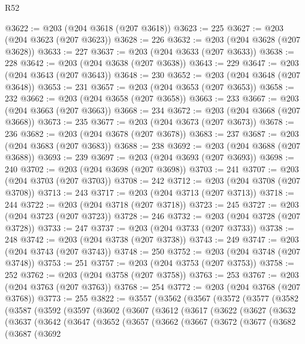 \begin{lexlean}{R52}
\begin{coremodule}
{{{{{{{{{{{{{{{{{{{{{{{{{{{{{{{{{{{{{{{{{{{{{{{{{{{{{{{{{{{{{{{{{{{{{{{{{{{{{{{{{{{{{{{{{{{{{{{{{{{{{{{{{{{{{{{{{{{{{{{{{{{{{{{{{{{{{{{{{{{{{{{{{{{{{{{{{{{{{{{{{{{{{{{{{{{{{{{{{{{{{{{{{{{{{{{{{{{{{{@3622 := @203 (@204 @3618 (@207 @3618))
@3623 := 225
@3627 := @203 (@204 @3623 (@207 @3623))
@3628 := 226
@3632 := @203 (@204 @3628 (@207 @3628))
@3633 := 227
@3637 := @203 (@204 @3633 (@207 @3633))
@3638 := 228
@3642 := @203 (@204 @3638 (@207 @3638))
@3643 := 229
@3647 := @203 (@204 @3643 (@207 @3643))
@3648 := 230
@3652 := @203 (@204 @3648 (@207 @3648))
@3653 := 231
@3657 := @203 (@204 @3653 (@207 @3653))
@3658 := 232
@3662 := @203 (@204 @3658 (@207 @3658))
@3663 := 233
@3667 := @203 (@204 @3663 (@207 @3663))
@3668 := 234
@3672 := @203 (@204 @3668 (@207 @3668))
@3673 := 235
@3677 := @203 (@204 @3673 (@207 @3673))
@3678 := 236
@3682 := @203 (@204 @3678 (@207 @3678))
@3683 := 237
@3687 := @203 (@204 @3683 (@207 @3683))
@3688 := 238
@3692 := @203 (@204 @3688 (@207 @3688))
@3693 := 239
@3697 := @203 (@204 @3693 (@207 @3693))
@3698 := 240
@3702 := @203 (@204 @3698 (@207 @3698))
@3703 := 241
@3707 := @203 (@204 @3703 (@207 @3703))
@3708 := 242
@3712 := @203 (@204 @3708 (@207 @3708))
@3713 := 243
@3717 := @203 (@204 @3713 (@207 @3713))
@3718 := 244
@3722 := @203 (@204 @3718 (@207 @3718))
@3723 := 245
@3727 := @203 (@204 @3723 (@207 @3723))
@3728 := 246
@3732 := @203 (@204 @3728 (@207 @3728))
@3733 := 247
@3737 := @203 (@204 @3733 (@207 @3733))
@3738 := 248
@3742 := @203 (@204 @3738 (@207 @3738))
@3743 := 249
@3747 := @203 (@204 @3743 (@207 @3743))
@3748 := 250
@3752 := @203 (@204 @3748 (@207 @3748))
@3753 := 251
@3757 := @203 (@204 @3753 (@207 @3753))
@3758 := 252
@3762 := @203 (@204 @3758 (@207 @3758))
@3763 := 253
@3767 := @203 (@204 @3763 (@207 @3763))
@3768 := 254
@3772 := @203 (@204 @3768 (@207 @3768))
@3773 := 255
@3822 := @3557
    (@3562
      (@3567
        (@3572
          (@3577
            (@3582
              (@3587
                (@3592
                  (@3597
                    (@3602
                      (@3607
                        (@3612
                          (@3617
                            (@3622
                              (@3627
                                (@3632
                                  (@3637
                                    (@3642
                                      (@3647
                                        (@3652
                                          (@3657
                                            (@3662
                                              (@3667
                                                (@3672
                                                  (@3677
                                                    (@3682
                                                      (@3687
                                                        (@3692
}}}}}}}}}}}}}}}}}}}}}}}}}}}}}}}}}}}}}}}}}}}}}}}}}}}}}}}}}}}}}}}}}}}}}}}}}}}}}}}}}}}}}}}}}}}}}}}}}}}}}}}}}}}}}}}}}}}}}}}}}}}}}}}}}}}}}}}}}}}}}}}}}}}}}}}}}}}}}}}}}}}}}}}}}}}}}}}}}}}}}}}}}}}}}}}}}}}}}}
\end{coremodule}
\end{lexlean}
